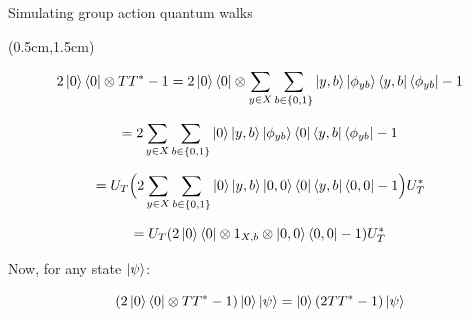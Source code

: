 \documentclass{beamer}
\theoremstyle{definition}
\begin{document}

        






\begin{frame}{Simulating group action quantum walks}
    
    \begin{textblock*}{12cm}(0.5cm,1.5cm)

            
        

        \[
        2\ket{0} \bra{0} \otimes TT^* - 1 = 2\ket{0} \bra{0} \otimes \sum_{y \in X} \sum_{b \in \{0, 1\}} \ket{y, b} \ket{\phi_{yb}} \bra{y, b} \bra{\phi_{yb}} - 1 
        \]

        \[
        = 2\sum_{y \in X} \sum_{b \in \{0, 1\}} \ket{0} \ket{y, b} \ket{\phi_{yb}} \bra{0} \bra{y, b} \bra{\phi_{yb}} - 1 
        \]

        \[
        = U_T \Big( 2\sum_{y \in X} \sum_{b \in \{0, 1\}} \ket{0} \ket{y, b} \ket{0, 0} \bra{0} \bra{y, b} \bra{0, 0} - 1 \Big) U_T^* 
        \]

        \[
        = U_T (2 \ket{0} \bra{0} \otimes 1_{X, b} \otimes \ket{0, 0} \bra{0, 0} - 1) U_T^*
        \]

        Now, for any state $\ket{\psi}$:

        \[
        (2\ket{0}\bra{0}\otimes TT^* - 1)\ket{0}\ket{\psi} = \ket{0}(2TT^*-1)\ket{\psi}
        \]

    \end{textblock*}

\end{frame}
\end{document}
